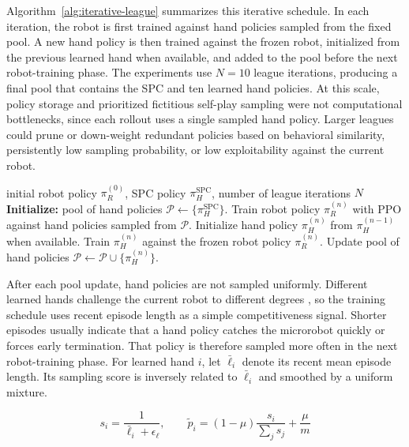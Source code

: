 \documentclass[journal,twoside,web]{ieeecolor2}
\begin{document}
Algorithm~\ref{alg:iterative-league} summarizes this iterative schedule. In each iteration, the robot is first trained against hand policies sampled from the fixed pool. A new hand policy is then trained against the frozen robot, initialized from the previous learned hand when available, and added to the pool before the next robot-training phase. The experiments use $N=10$ league iterations, producing a final pool that contains the SPC and ten learned hand policies. At this scale, policy storage and prioritized fictitious self-play sampling were not computational bottlenecks, since each rollout uses a single sampled hand policy. Larger leagues could prune or down-weight redundant policies based on behavioral similarity, persistently low sampling probability, or low exploitability against the current robot.

\begin{algorithm}[!t]
\caption{Iterative League Training}
\label{alg:iterative-league}
\footnotesize
\begin{algorithmic}[1]
\Require initial robot policy $\pi_R^{(0)}$, SPC policy $\pi_H^{\mathrm{SPC}}$, number of league iterations $N$
\Statex \textbf{Initialize:} pool of hand policies $\mathcal{P}\leftarrow\{\pi_H^{\mathrm{SPC}}\}$.
  \State Train robot policy $\pi_R^{(n)}$ with PPO against hand policies
  \Statex \hspace{\algorithmicindent} sampled from $\mathcal{P}$.
  \State Initialize hand policy $\pi_H^{(n)}$ from $\pi_H^{(n-1)}$ when available.
  \State Train $\pi_H^{(n)}$ against the frozen robot policy $\pi_R^{(n)}$.
  \State Update pool of hand policies $\mathcal{P}\leftarrow\mathcal{P}\cup\{\pi_H^{(n)}\}$.
\EndFor
\end{algorithmic}
\end{algorithm}

After each pool update, hand policies are not sampled uniformly. Different learned hands challenge the current robot to different degrees \cite{huangOpponentAwareLeague2023}, so the training schedule uses recent episode length as a simple competitiveness signal. Shorter episodes usually indicate that a hand policy catches the microrobot quickly or forces early termination. That policy is therefore sampled more often in the next robot-training phase. For learned hand $i$, let $\bar{\ell}_i$ denote its recent mean episode length. Its sampling score is inversely related to $\bar{\ell}_i$ and smoothed by a uniform mixture.

\begin{equation}
s_i = \frac{1}{\bar{\ell}_i+\epsilon_{\ell}},
\qquad
\widetilde{p}_i = (1-\mu)\frac{s_i}{\sum_j s_j}+\frac{\mu}{m}
\label{eq:opponent-sampling}
\end{equation}
\end{document}

